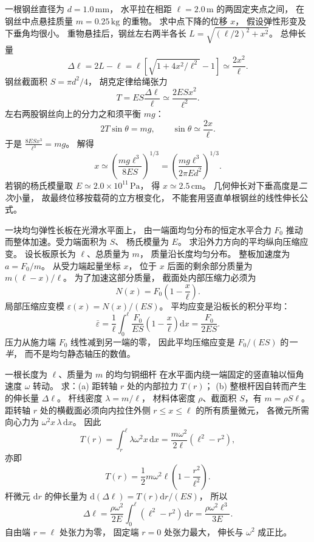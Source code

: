 一根钢丝直径为 $d=1.0\,\mathrm{mm}$，
水平拉在相距 $\ell=2.0\,\mathrm m$ 的两固定夹点之间，
在钢丝中点悬挂质量 $m=0.25\,\mathrm{kg}$ 的重物。
求中点下降的位移 $x$，
假设弹性形变及下垂角均很小。
\exsolution
重物悬挂后，钢丝左右两半各长
$L=\sqrt{(\ell/2)^2+x^2}$。
总伸长量
\[
\Delta\ell=2L-\ell
=\ell\left[\sqrt{1+4x^2/\ell^2}-1\right]
\simeq\frac{2x^2}{\ell}.
\]
钢丝截面积 $S=\pi d^2/4$，
胡克定律给绳张力
\[
T=ES\frac{\Delta\ell}{\ell}
\simeq\frac{2ESx^2}{\ell^2}.
\]
左右两股钢丝向上的分力之和须平衡 $mg$：
\[
2T\sin\theta=mg,\qquad
\sin\theta\simeq\frac{2x}{\ell}.
\]
于是
$\frac{8ESx^3}{\ell^3}=mg$。
解得
\[
\boxed{x\simeq
\left(\frac{mg\ell^3}{8ES}\right)^{1/3}
=\left(\frac{mg\ell^3}{2\pi E d^2}\right)^{1/3}}.
\]
若钢的杨氏模量取
$E\simeq2.0\times10^{11}\,\mathrm{Pa}$，
得 $\boxed{x\simeq2.5\,\mathrm{cm}}$。
\excheck 几何伸长对下垂高度是\emph{二次}小量，
故最终位移按载荷的立方根变化，
不能套用竖直单根钢丝的线性伸长公式。

一块均匀弹性长板在光滑水平面上，
由一端面均匀分布的恒定水平合力 $F_0$
推动而整体加速。受力端面积为 $S$、
杨氏模量为 $E$。
求沿外力方向的平均纵向压缩应变。
\exsolution
设长板原长为 $\ell$、总质量为 $m$，
质量沿长度均匀分布。
整板加速度为 $a=F_0/m$。
从受力端起量坐标 $x$，
位于 $x$ 后面的剩余部分质量为
$m(\ell-x)/\ell$。
为了加速这部分质量，
截面处内部压缩力必须为
\[
N(x)=F_0\left(1-\frac{x}{\ell}\right).
\]
局部压缩应变模
$\varepsilon(x)=N(x)/(ES)$。
平均应变是沿板长的积分平均：
\[
\bar\varepsilon
=\frac1\ell\int_0^\ell
\frac{F_0}{ES}\left(1-\frac{x}{\ell}\right)\mathrm dx
=\boxed{\frac{F_0}{2ES}}.
\]
\excheck 压力从施力端 $F_0$ 线性减到另一端的零，
因此平均压缩应变是
$F_0/(ES)$ 的\emph{一半}，
而不是均匀静态轴压的数值。

一根长度为 $\ell$、质量为 $m$ 的均匀铜细杆
在水平面内绕一端固定的竖直轴以恒角速度
$\omega$ 转动。
求：(a) 距转轴 $r$ 处的内部拉力 $T(r)$；
(b) 整根杆因自转而产生的伸长量 $\Delta\ell$。
\exsolution
杆线密度 $\lambda=m/\ell$，
材料体密度 $\rho$、截面积 $S$，有
$m=\rho S\ell$。
距转轴 $r$ 处的横截面必须向内拉住外侧
$r\le x\le\ell$ 的所有质量微元，
各微元所需向心力为
$\omega^2x\,\lambda\,\mathrm dx$。
因此
\[
T(r)=\int_r^\ell\lambda\omega^2x\,\mathrm dx
=\frac{m\omega^2}{2\ell}(\ell^2-r^2),
\]
亦即
\[
\boxed{T(r)=\frac12m\omega^2\ell
\left(1-\frac{r^2}{\ell^2}\right)}.
\]
杆微元 $\mathrm dr$ 的伸长量为
$\mathrm d(\Delta\ell)=T(r)\mathrm dr/(ES)$，
所以
\[
\Delta\ell
=\frac{\rho\omega^2}{2E}\int_0^\ell
(\ell^2-r^2)\,\mathrm dr
=\boxed{\frac{\rho\omega^2\ell^3}{3E}}.
\]
\excheck 自由端 $r=\ell$ 处张力为零，
固定端 $r=0$ 处张力最大，
伸长与 $\omega^2$ 成正比。

